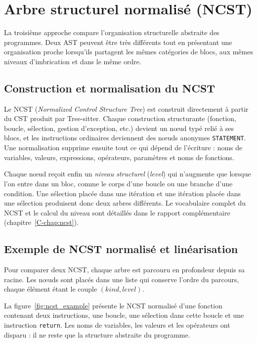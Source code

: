 \documentclass[12pt,a4paper,oneside]{report}
\begin{document}
\section{Arbre structurel normalisé (NCST)}

La troisième approche compare l'organisation structurelle abstraite des
programmes. Deux AST peuvent être très différents tout en présentant une
organisation proche lorsqu'ils partagent les mêmes catégories de blocs, aux
mêmes niveaux d'imbrication et dans le même ordre.

\subsection{Construction et normalisation du NCST}

Le NCST (\emph{Normalized Control Structure Tree}) est construit directement
à partir du CST produit par Tree-sitter. Chaque construction structurante
(fonction, boucle, sélection, gestion d'exception, etc.) devient un nœud
typé relié à ses blocs, et les instructions ordinaires deviennent des nœuds
anonymes \texttt{STATEMENT}. Une normalisation supprime ensuite tout ce qui
dépend de l'écriture : noms de variables, valeurs, expressions, opérateurs,
paramètres et noms de fonctions.

Chaque nœud reçoit enfin un \emph{niveau structurel} (\emph{level}) qui
n'augmente que lorsque l'on entre dans un bloc, comme le corps d'une boucle
ou une branche d'une condition. Une sélection placée dans une itération et
une itération placée dans une sélection produisent donc deux arbres
différents. Le vocabulaire complet du NCST et le calcul du niveau sont
détaillés dans le rapport complémentaire (chapitre~\ref{C-chap:ncst}).


\subsection{Exemple de NCST normalisé et linéarisation}

Pour comparer deux NCST, chaque arbre est parcouru en profondeur depuis sa
racine. Les nœuds sont placés dans une liste qui conserve l'ordre du parcours,
chaque élément étant le couple $(\mathit{kind}, \mathit{level})$.

La figure~\ref{fig:ncst_example} présente le NCST normalisé d'une fonction
contenant deux instructions, une boucle, une sélection dans cette boucle et
une instruction \texttt{return}. Les noms de variables, les valeurs et les
opérateurs ont disparu : il ne reste que la structure abstraite du programme.
\end{document}
